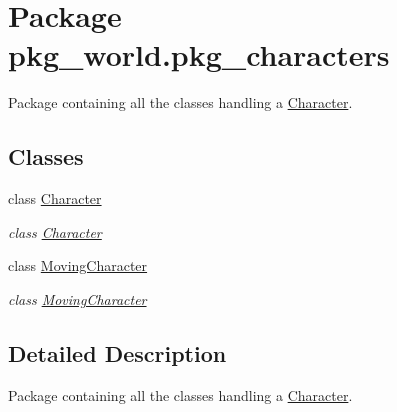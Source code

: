 \hypertarget{namespacepkg__world_1_1pkg__characters}{\section{Package pkg\-\_\-world.\-pkg\-\_\-characters}
\label{namespacepkg__world_1_1pkg__characters}
}


Package containing all the classes handling a \hyperlink{classpkg__world_1_1pkg__characters_1_1Character}{Character}.  


\subsection*{Classes}
\begin{DoxyCompactItemize}
\item 
class \hyperlink{classpkg__world_1_1pkg__characters_1_1Character}{Character}
\begin{DoxyCompactList}\small\item\em class \hyperlink{classpkg__world_1_1pkg__characters_1_1Character}{Character} \end{DoxyCompactList}\item 
class \hyperlink{classpkg__world_1_1pkg__characters_1_1MovingCharacter}{Moving\-Character}
\begin{DoxyCompactList}\small\item\em class \hyperlink{classpkg__world_1_1pkg__characters_1_1MovingCharacter}{Moving\-Character} \end{DoxyCompactList}\end{DoxyCompactItemize}


\subsection{Detailed Description}
Package containing all the classes handling a \hyperlink{classpkg__world_1_1pkg__characters_1_1Character}{Character}. 